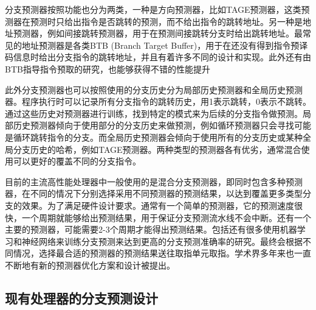分支预测器按照功能也分为两类，一种是方向预测器，比如TAGE预测器\cite{tage}，这类预测器在预测时只给出指令是否跳转的预测，而不给出指令的跳转地址。另一种是地址预测器，例如间接跳转预测器，用于在预测间接跳转分支时给出跳转地址。最常见的地址预测器是各类BTB (Branch Target Buffer)\cite{btb}，用于在还没有得到指令预译码信息时给出分支指令的跳转地址，并且有着许多不同的设计和实现。此外还有由BTB指导指令预取的研究\cite{btb-prefetch}，也能够获得不错的性能提升

此外分支预测器也可以按照使用的分支历史分为局部历史预测器和全局历史预测器。程序执行时可以记录所有分支指令的跳转历史，用1表示跳转，0表示不跳转。通过这些历史对预测器进行训练，找到特定的模式来为后续的分支指令做预测。局部历史预测器倾向于使用部分的分支历史来做预测，例如循环预测器只会寻找可能是循环跳转指令的分支。而全局历史预测器会倾向于使用所有的分支历史或某种全局分支历史的哈希，例如TAGE预测器。两种类型的预测器各有优劣，通常混合使用可以更好的覆盖不同的分支指令。

目前的主流高性能处理器中一般使用的是混合分支预测器，即同时包含多种预测器，在不同的情况下分别选择采用不同预测器的预测结果，以达到覆盖更多类型分支的效果。为了满足硬件设计要求。通常有一个简单的预测器，它的预测速度很快，一个周期就能够给出预测结果，用于保证分支预测流水线不会中断。还有一个主要的预测器，可能需要2-3个周期才能得出预测结果。包括还有很多使用机器学习和神经网络来训练分支预测来达到更高的分支预测准确率的研究。最终会根据不同情况，选择最合适的预测器的预测结果送往取指单元取指。学术界多年来也一直不断地有新的预测器优化方案和设计被提出\cite{perceptron-indirect, acb}。

\subsection{现有处理器的分支预测设计}


